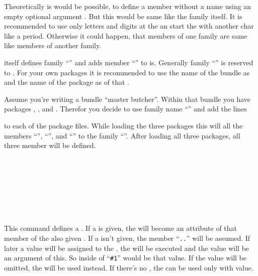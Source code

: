 Theoretically is would be possible, to define a member without a name using an
empty optional argument . But this would be same like the
family itself. It is recommended to use only letters and digits at the
 an start the  with another char like a
period. Otherwise it could happen, that members of one family are same like
members of another family.

 itself defines family ``'' and adds member
``'' to is. Generally family ``'' is
reserved to \KOMAScript{}. For your own packages it is recommended to use the
name of the bundle as  and the name of the package as
 of that .
%
\begin{Example}
  Assume you're writing a bundle ``master butcher''. Within that bundle you
  have packages , , and
  . Therefor you decide to use family name
  ``'' and add the lines
\begin{lstcode}
\end{lstcode}
  to each of the package files. While loading the three packages this will
  all the members ``'', ``'',
  and ``'' to the family ``''. After
  loading all three packages, all three member will be defined.
\end{Example}
%
%
%


\begin{Declaration}
  \\
  \\
  \\
  \\
  \\
  \\
\end{Declaration}
%
%
%
%
%
%
This command defines a . If a  is given, the
 will become an attribute of that member of the also given
. If a  isn't given, the member
``\texttt{.}\texttt{.}'' will be assumed. If
later a value will be assigned to the , the  will be
executed and the value will be an argument of this. So inside of
 ``\lstinline{#1}'' would be that value. If the value will be
omitted, the  will be used instead. If there's no
, the  can be used only with value.

